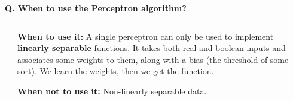 \begin{frame}[fragile]{\textbf{Q. When to use the Perceptron algorithm?}}
  \begin{columns}[t]
    \begin{column}{.4\textwidth}
    \end{column}
    \begin{column}{.6\textwidth}
      \begin{wideitemize}\vspace{-0.9em}
      \item \textbf{When to use it:} A single perceptron can only be used to
        implement \textbf{linearly separable} functions. It takes both real and
        boolean inputs and associates some weights to them, along with a bias
        (the threshold of some sort). We learn the weights, then we get the function.
      \item \textbf{When not to use it:} Non-linearly separable data.
      \end{wideitemize}
    \end{column}
  \end{columns}

\end{frame}


